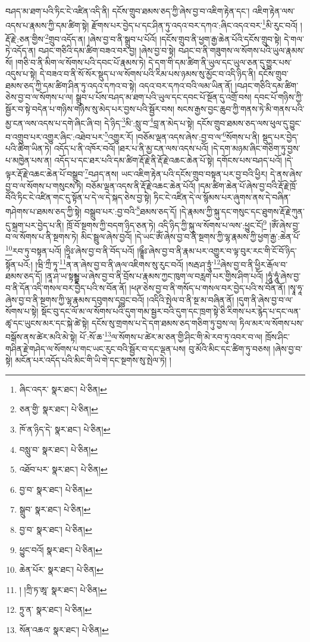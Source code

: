 བཤད་མ་ཐག་པའི་ཏིང་ངེ་འཛིན་འདི་ནི། དངོས་གྲུབ་ཐམས་ཅད་ཀྱི་ཞེས་བྱ་བ་འཇིག་རྟེན་དང་། འཇིག་རྟེན་ལས་འདས་པ་རྣམས་ཀྱི་དམ་ཚིག་སྟེ། རྫོགས་པར་བྱེད་པ་དང་ཤིན་ཏུ་འདའ་བར་དཀའ་:ཞིང་འདའ་བར་\footnote{ཞིང་འདར་  སྣར་ཐང་།  པེ་ཅིན། }མི་རུང་བའོ། །རྡོ་རྗེ་:ཅན་གྱིས་\footnote{ཅན་གྱི་  སྣར་ཐང་།  པེ་ཅིན། }གྲུབ་འདོད་ན། །ཞེས་བྱ་བ་ནི་སྒྲུབ་པ་པོའོ། །དངོས་གྲུབ་ནི་ཕྱག་རྒྱ་ཆེན་པོའི་དངོས་གྲུབ་སྟེ། དེ་གལ་ཏེ་འདོད་ན། བཤང་གཅིའི་དམ་ཚིག་བཟའ་བར་བྱ། །ཞེས་བྱ་བ་སྟེ། བཤང་བ་ནི་གཟུགས་ལ་སོགས་པའི་ཡུལ་རྣམས་སོ། །གཅི་བ་ནི་མིག་ལ་སོགས་པའི་དབང་པོ་རྣམས་ཏེ། དེ་དག་གི་དམ་ཚིག་ནི་ཡུལ་དང་ཡུལ་ཅན་དུ་གྱུར་པས་འདུས་པ་སྟེ། དེ་བཟའ་བ་ནི་སོ་སོར་སྡུད་པ་ལ་སོགས་པའི་རིམ་པས་ཉམས་སུ་མྱོང་བ་འདི་ཉིད་ནི། དངོས་གྲུབ་ཐམས་ཅད་ཀྱི་དམ་ཚིག་ཤིན་ཏུ་འདའ་དཀའ་བ་སྟེ། འདའ་བར་དཀའ་བའི་ལམ་ཡིན་ནོ། །བཤང་གཅིའི་དམ་ཚིག་ཅེས་བྱ་བ་ལ་སོགས་པ་ལ། སྒྲུབ་པ་པོས་བཤད་མ་ཐག་པའི་ཡུལ་དང་དབང་པོ་སྔོན་དུ་འགྲོ་བས། དབང་པོ་གཉིས་ཀྱི་སྦྱོར་བ་སྟེ་བདེན་པ་གཉིས་གཉིས་སུ་མེད་པར་བྱས་པའི་སྦྱོར་བས། སངས་རྒྱས་བྱང་ཆུབ་ཀྱི་གནས་ཏེ་མི་གནས་པའི་མྱ་ངན་ལས་འདས་པ་དགེ་ཞིང་ཞི་བ། དེ་ཉིད་\footnote{ཁོ་ན་ཉིད་དེ་  སྣར་ཐང་།  པེ་ཅིན། }མི་:སླུ་བ་\footnote{བསླུ་བ་  སྣར་ཐང་།  པེ་ཅིན། }བླ་ན་མེད་པ་སྟེ། དངོས་གྲུབ་ཐམས་ཅད་ལས་ཕུལ་དུ་བྱུང་བ་འགྲུབ་པར་འགྱུར་ཞིང་:འཐེབ་པར་\footnote{འཐོབ་པར་  སྣར་ཐང་།  པེ་ཅིན། }འགྱུར་རོ། །བཅོམ་ལྡན་འདས་ཞེས་:བྱ་བ་ལ་\footnote{བྱ་བ་  སྣར་ཐང་།  པེ་ཅིན། }སོགས་པ་ནི། སྡུད་པར་བྱེད་པའི་ཚིག་ཡིན་ཏེ། འདོད་པ་ནི་འཁོར་བའོ། །ཐར་པ་ནི་མྱ་ངན་ལས་འདས་པའོ། །དེ་དག་མཉམ་ཞིང་གཅིག་ཏུ་བྱས་པ་མཁྱེན་པས་ན། འདོད་པ་དང་ཐར་པའི་དམ་ཚིག་རྡོ་རྗེ་ནི་རྡོ་རྗེ་འཆང་ཆེན་པོ་སྟེ། དགོངས་པས་བཤད་པའོ། །དེ་ལྟར་རྡོ་རྗེ་འཆང་ཆེན་པོ་བསྒྲུབ་\footnote{སྒྲུབ་  སྣར་ཐང་།  པེ་ཅིན། }བཤད་ནས། ཡང་འཇིག་རྟེན་པའི་དངོས་གྲུབ་བསྟན་པར་བྱ་བའི་ཕྱིར། དེ་ནས་ཞེས་བྱ་བ་ལ་སོགས་པ་གསུངས་ཏེ། བཅོམ་ལྡན་འདས་ནི་རྡོ་རྗེ་འཆང་ཆེན་པོའོ། །དམ་ཚིག་ཆེན་པོ་ཞེས་བྱ་བའི་རྡོ་རྗེ་ཁྲོ་བོའི་ཏིང་ངེ་འཛིན་གང་དུ་སྟོན་པ་དེ་ལ་དེ་སྐད་ཅེས་བྱ་སྟེ། ཏིང་ངེ་འཛིན་དེ་ལ་སྙོམས་པར་ཞུགས་ནས་དེ་བཞིན་གཤེགས་པ་ཐམས་ཅད་ཀྱི་སྟེ། བསྒྲུབ་པར་:བྱ་བའི་\footnote{བྱ་བ་  སྣར་ཐང་།  པེ་ཅིན། }ཐམས་ཅད་དོ། །དེ་རྣམས་ཀྱི་སྐུ་དང་གསུང་དང་ཐུགས་རྡོ་རྗེ་ཀུན་དུ་སྐྲག་པར་བྱེད་པ་ནི། ཁྲོ་བོ་སྔགས་ཀྱི་བདག་ཉིད་ཅན་ཏེ། འདི་ཉིད་ཀྱི་སྐུ་ལ་སོགས་པ་ལས་:ཕྱུང་ངོ།\footnote{ཕྱུང་བའོ།  སྣར་ཐང་།  པེ་ཅིན། } །ཨོཾ་ཞེས་བྱ་བ་ལ་སོགས་པ་ནི་སྔགས་ཏེ། མིང་སྦྲུལ་ཞེས་བྱའོ། །དེ་ཡང་ཨོཾ་ཞེས་བྱ་བ་ནི་སྔགས་ཀྱི་ལྷ་རྣམས་ཀྱི་ཕྱག་རྒྱ་:ཆེན་པོ་\footnote{ཆེན་པོར་  སྣར་ཐང་།  པེ་ཅིན། }རབ་ཏུ་བསྟན་པའོ། །ཧྲཱིཿ་ཞེས་བྱ་བ་ནི་བོད་པའོ། །ཥྚྲཱྀཿ་ཞེས་བྱ་བ་ནི་རྣམ་པར་འགྱུར་བ་ལྟ་བུར་རང་གི་ངོ་བོ་ཉིད་སྟོན་པའོ:། །ཝི་ཀྲྀ་ཏཱ་\footnote{། །ཀྲི་ཏ་ཨཱ་  སྣར་ཐང་།  པེ་ཅིན། }ན་ན་ཞེས་བྱ་བ་ནི་ཞལ་འཇིགས་སུ་རུང་བའོ། །སརྦ་ཤ་ཏྲཱུཾ་\footnote{ཏྲུ་ན་  སྣར་ཐང་།  པེ་ཅིན། }ཞེས་བྱ་བ་ནི་ཕྱིར་རྒོལ་བ་ཐམས་ཅད་དོ། །ནཱ་ཤ་ཡ་སྟམྦྷ་ཡ་ཞེས་བྱ་བ་ནི་བྲོས་པ་རྣམས་ཀྱང་ཁུག་ལ་བརླག་པར་གྱིས་ཤིག་པའོ། །ཧཱུཾ་ཧཱུཾ་ཞེས་བྱ་བ་ནི་དོན་འདི་གསལ་བར་བྱེད་པའི་ས་བོན་ནོ། །ཕཊ་ཅེས་བྱ་བ་ནི་གསོད་པ་གསལ་བར་བྱེད་པའི་ས་བོན་ནོ། །སྭཱ་ཧཱ་ཞེས་བྱ་བ་ནི་སྔགས་ཀྱི་ལྷ་རྣམས་དབུགས་དབྱུང་བའོ། །འདིའི་སྤེལ་བ་ནི་སྔ་མ་བཞིན་ནོ། །དུག་ནི་ཞེས་བྱ་བ་ལ་སོགས་པ་སྟེ། སྡོང་བུ་དང་ལོ་མ་ལ་སོགས་པའི་དུག་གམ་སྦྱར་བའི་དུག་དང་ཁྲག་སྟེ་ཅི་རིགས་པར་རྙེད་པ་དང་ལན་ཚྭ་དང་ཡུངས་མར་དང་སྐེ་ཚེ་སྟེ། དངོས་སུ་གྲགས་པ་དེ་དག་ཐམས་ཅད་གཅིག་ཏུ་བྱས་ལ། ཏིལ་མར་ལ་སོགས་པས་བསྒོས་ནས་ཚེར་མའི་མེ་སྟེ། པོ་:སོ་ཆ་\footnote{སོན་འཆའ་  སྣར་ཐང་།  པེ་ཅིན། }ལ་སོགས་པ་ཚེར་མ་ཅན་གྱི་ཤིང་གི་མེ་རབ་ཏུ་འབར་བ་ལ། ཁྲོས་ཤིང་གཤིན་རྗེ་གཤེད་ལ་སོགས་པ་གང་ཡང་རུང་བའི་སྦྱོར་བ་དང་ལྡན་པས། བུ་མོའི་མིང་དང་ཚིག་ཏུ་བཅས། །ཞེས་བྱ་བ་སྟེ། མངོན་པར་འདོད་པའི་མིང་གི་ཡི་གེ་དང་སྔགས་སུ་སྤེལ་ཏེ། །
